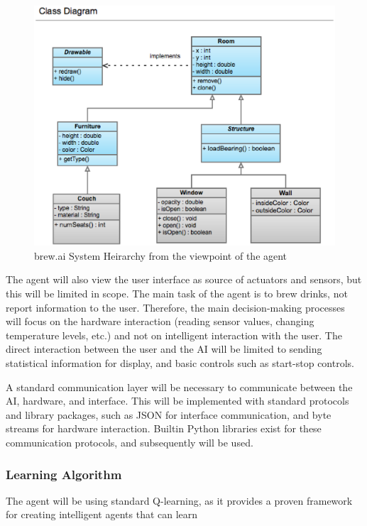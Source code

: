 \documentclass[draftclsnofoot,onecolumn,letterpaper,10pt]{IEEEtran}
\begin{document}
\begin{figure}\label{fig:AIsystemDesign}
\begin{center}
	\caption{brew.ai System Heirarchy from the viewpoint of the agent}
	\includegraphics[scale=0.3]{tmp.eps}
\end{center}
\end{figure}

The agent will also view the user interface as source of actuators and sensors, but this will be limited in scope.
The main task of the agent is to brew drinks, not report information to the user.
Therefore, the main decision-making processes will focus on the hardware interaction (reading sensor values, changing temperature levels, etc.) and not on intelligent interaction with the user.
The direct interaction between the user and the AI will be limited to sending statistical information for display, and basic controls such as start-stop controls.

A standard communication layer will be necessary to communicate between the AI, hardware, and interface.
This will be implemented with standard protocols and library packages, such as JSON for interface communication, and byte streams for hardware interaction.
Builtin Python libraries exist for these communication protocols, and subsequently will be used.

\subsubsection{Learning Algorithm} 
The agent will be using standard Q-learning, as it provides a proven framework for creating intelligent agents that can learn
\end{document}

